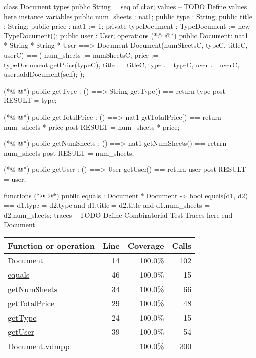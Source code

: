 \begin{vdmpp}[breaklines=true]
class Document
types
public String = seq of char;
values
-- TODO Define values here
instance variables
 public num_sheets : nat1;
 public type : String;
 public title : String;
 public price : nat1 := 1;
 private typeDocument : TypeDocument := new TypeDocument();
 public user : User;
operations
(*@
\label{Document:14}
@*)
 public Document: nat1 * String * String * User ==> Document
  Document(numSheetsC, typeC, titleC, userC) == (
   num_sheets := numSheetsC;
   price := typeDocument.getPrice(typeC);
   title := titleC;
   type := typeC;
   user := userC;
   user.addDocument(self);
  );
 
(*@
\label{getType:24}
@*)
 public getType : () ==> String
 getType() ==
  return type
  post RESULT = type;
 
(*@
\label{getTotalPrice:29}
@*)
 public getTotalPrice : () ==> nat1
 getTotalPrice() ==
  return num_sheets * price
  post RESULT = num_sheets * price;
 
(*@
\label{getNumSheets:34}
@*)
  public getNumSheets : () ==> nat1
 getNumSheets() ==
  return num_sheets
  post RESULT = num_sheets;
 
(*@
\label{getUser:39}
@*)
 public getUser : () ==> User
 getUser() ==
  return user
  post RESULT = user;
  
  
functions
(*@
\label{equals:46}
@*)
public equals : Document * Document -> bool
equals(d1, d2) ==
  d1.type = d2.type and d1.title = d2.title and d1.num_sheets = d2.num_sheets;
traces
-- TODO Define Combinatorial Test Traces here
end Document
\end{vdmpp}
\bigskip
\begin{longtable}{|l|r|r|r|}
\hline
Function or operation & Line & Coverage & Calls \\
\hline
\hline
\hyperref[Document:14]{Document} & 14&100.0\% & 102 \\
\hline
\hyperref[equals:46]{equals} & 46&100.0\% & 15 \\
\hline
\hyperref[getNumSheets:34]{getNumSheets} & 34&100.0\% & 66 \\
\hline
\hyperref[getTotalPrice:29]{getTotalPrice} & 29&100.0\% & 48 \\
\hline
\hyperref[getType:24]{getType} & 24&100.0\% & 15 \\
\hline
\hyperref[getUser:39]{getUser} & 39&100.0\% & 54 \\
\hline
\hline
Document.vdmpp & & 100.0\% & 300 \\
\hline
\end{longtable}

